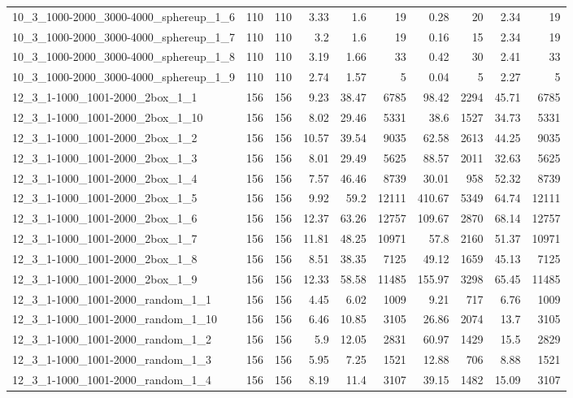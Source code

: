 \begin{center}
\begin{scriptsize}
\begin{longtable}{lrrrrrrrrr}
10\_3\_1000-2000\_3000-4000\_sphereup\_1\_6 & 110 & 110 & 3.33 & 1.6 & 19 & 0.28 & 20 & 2.34 & 19\\
10\_3\_1000-2000\_3000-4000\_sphereup\_1\_7 & 110 & 110 & 3.2 & 1.6 & 19 & 0.16 & 15 & 2.34 & 19\\
10\_3\_1000-2000\_3000-4000\_sphereup\_1\_8 & 110 & 110 & 3.19 & 1.66 & 33 & 0.42 & 30 & 2.41 & 33\\
10\_3\_1000-2000\_3000-4000\_sphereup\_1\_9 & 110 & 110 & 2.74 & 1.57 & 5 & 0.04 & 5 & 2.27 & 5\\
12\_3\_1-1000\_1001-2000\_2box\_1\_1 & 156 & 156 & 9.23 & 38.47 & 6785 & 98.42 & 2294 & 45.71 & 6785\\
12\_3\_1-1000\_1001-2000\_2box\_1\_10 & 156 & 156 & 8.02 & 29.46 & 5331 & 38.6 & 1527 & 34.73 & 5331\\
12\_3\_1-1000\_1001-2000\_2box\_1\_2 & 156 & 156 & 10.57 & 39.54 & 9035 & 62.58 & 2613 & 44.25 & 9035\\
12\_3\_1-1000\_1001-2000\_2box\_1\_3 & 156 & 156 & 8.01 & 29.49 & 5625 & 88.57 & 2011 & 32.63 & 5625\\
12\_3\_1-1000\_1001-2000\_2box\_1\_4 & 156 & 156 & 7.57 & 46.46 & 8739 & 30.01 & 958 & 52.32 & 8739\\
12\_3\_1-1000\_1001-2000\_2box\_1\_5 & 156 & 156 & 9.92 & 59.2 & 12111 & 410.67 & 5349 & 64.74 & 12111\\
12\_3\_1-1000\_1001-2000\_2box\_1\_6 & 156 & 156 & 12.37 & 63.26 & 12757 & 109.67 & 2870 & 68.14 & 12757\\
12\_3\_1-1000\_1001-2000\_2box\_1\_7 & 156 & 156 & 11.81 & 48.25 & 10971 & 57.8 & 2160 & 51.37 & 10971\\
12\_3\_1-1000\_1001-2000\_2box\_1\_8 & 156 & 156 & 8.51 & 38.35 & 7125 & 49.12 & 1659 & 45.13 & 7125\\
12\_3\_1-1000\_1001-2000\_2box\_1\_9 & 156 & 156 & 12.33 & 58.58 & 11485 & 155.97 & 3298 & 65.45 & 11485\\
12\_3\_1-1000\_1001-2000\_random\_1\_1 & 156 & 156 & 4.45 & 6.02 & 1009 & 9.21 & 717 & 6.76 & 1009\\
12\_3\_1-1000\_1001-2000\_random\_1\_10 & 156 & 156 & 6.46 & 10.85 & 3105 & 26.86 & 2074 & 13.7 & 3105\\
12\_3\_1-1000\_1001-2000\_random\_1\_2 & 156 & 156 & 5.9 & 12.05 & 2831 & 60.97 & 1429 & 15.5 & 2829\\
12\_3\_1-1000\_1001-2000\_random\_1\_3 & 156 & 156 & 5.95 & 7.25 & 1521 & 12.88 & 706 & 8.88 & 1521\\
12\_3\_1-1000\_1001-2000\_random\_1\_4 & 156 & 156 & 8.19 & 11.4 & 3107 & 39.15 & 1482 & 15.09 & 3107\\

\end{longtable}
\end{scriptsize}
\end{center}
